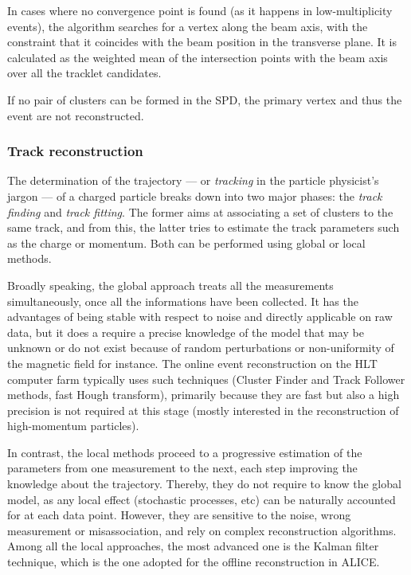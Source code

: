 In cases where no convergence point is found (as it happens in low-multiplicity events), the algorithm searches for a vertex along the beam axis, with the constraint that it coincides with the beam position in the transverse plane. It is calculated as the weighted mean of the intersection points with the beam axis over all the tracklet candidates.

If no pair of clusters can be formed in the SPD, the primary vertex and thus the event are not reconstructed.

\subsubsection{Track reconstruction}
\label{subsubsec:TrackReco}

The determination of the trajectory --- or \textit{tracking} in the particle physicist's jargon --- of a charged particle breaks down into two major phases: the \textit{track finding} and \textit{track fitting}. The former aims at associating a set of clusters to the same track, and from this, the latter tries to estimate the track parameters such as the charge or momentum. Both can be performed using global or local methods.

Broadly speaking, the global approach treats all the measurements simultaneously, once all the informations have been collected. It has the advantages of being stable with respect to noise and directly applicable on raw data, but it does a require a precise knowledge of the model that may be unknown or do not exist because of random perturbations or non-uniformity of the magnetic field for instance. The online event reconstruction on the HLT computer farm typically uses such techniques (Cluster Finder and Track Follower methods, fast Hough transform), primarily because they are fast but also a high precision is not required at this stage (mostly interested in the reconstruction of high-momentum particles).

In contrast, the local methods proceed to a progressive estimation of the parameters  from one measurement to the next, each step improving the knowledge about the trajectory. Thereby, they do not require to know the global model, as any local effect (stochastic processes, etc) can be naturally accounted for at each data point. However, they are sensitive to the noise, wrong measurement or misassociation, and rely on complex reconstruction algorithms. Among all the local approaches, the most advanced one is the Kalman filter technique, which is the one adopted for the offline reconstruction in ALICE. 

